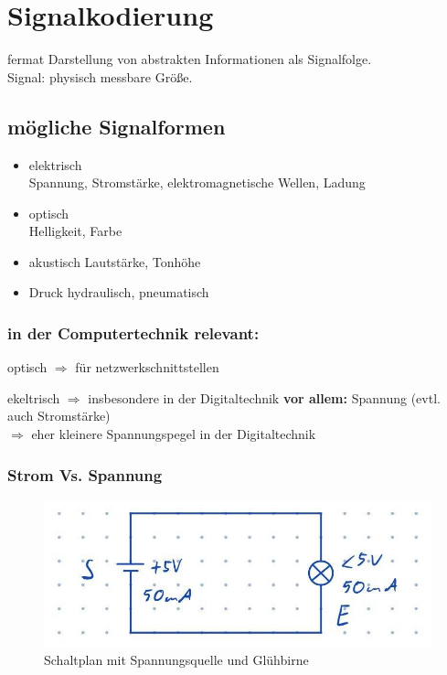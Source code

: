 \documentclass[10pt,a4paper]{scrartcl}
\begin{document}
\section{Signalkodierung}

\begin{Theorem}{}{fermat}
	Darstellung von abstrakten Informationen als Signalfolge. \\
	Signal: physisch messbare Größe.
\end{Theorem}

\subsection{mögliche Signalformen}
\begin{itemize}
	\renewcommand\labelitemi{--}
	
	\item elektrisch\\
		Spannung, Stromstärke, elektromagnetische Wellen, Ladung
	\item optisch\\
		Helligkeit, Farbe
	\item akustisch
		Lautstärke, Tonhöhe
	\item Druck
		hydraulisch, pneumatisch
\end{itemize}

\subsubsection*{in der Computertechnik relevant:}

\begin{list}{}{}
	\item[] optisch $\Rightarrow$ für netzwerkschnittstellen
	\item ekeltrisch $\Rightarrow$ insbesondere in der Digitaltechnik
	\subitem \textbf{vor allem:} Spannung (evtl. auch Stromstärke)\\
	\hspace*{2em}$\Rightarrow$ eher kleinere Spannungspegel in der Digitaltechnik
\end{list}

\subsubsection*{Strom Vs. Spannung}
\begin{figure}
	\centering
	\includegraphics[width=0.5\linewidth]{img/strom_spannung_signale}
	\caption{Schaltplan mit Spannungsquelle und Glühbirne}
	\label{abb:schaltplan}
\end{figure}
\end{document}
